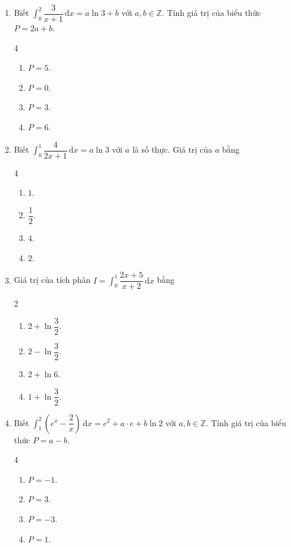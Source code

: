 \documentclass[12pt]{article}
\begin{document}
\begin{enumerate}[label=\textbf{Câu \arabic*.}]
		\item Biết $\displaystyle \int_0^2 \dfrac{3}{x + 1}\,\mathrm{d}x = a\ln 3 + b$ với $a, b \in \mathbb{Z}$. Tính giá trị của biểu thức $P = 2a + b$.
		\begin{multicols}{4}
			\begin{enumerate}[label=\textbf{\Alph*.}]
				\item $P = 5$.
				\item $P = 0$.
				\item $P = 3$.
				\item $P = 6$.
			\end{enumerate}
		\end{multicols}
		
		\item Biết $\displaystyle \int_0^1 \dfrac{4}{2x + 1}\,\mathrm{d}x = a\ln 3$ với $a$ là số thực. Giá trị của $a$ bằng
		\begin{multicols}{4}
			\begin{enumerate}[label=\textbf{\Alph*.}]
				\item $1$.
				\item $\dfrac{1}{2}$.
				\item $4$.
				\item $2$.
			\end{enumerate}
		\end{multicols}
		
		\item Giá trị của tích phân $I = \displaystyle \int_0^1 \dfrac{2x + 5}{x + 2}\,\mathrm{d}x$ bằng
		\begin{multicols}{2}
			\begin{enumerate}[label=\textbf{\Alph*.}]
				\item $2 + \ln\dfrac{3}{2}$.
				\item $2 - \ln\dfrac{3}{2}$.
				\item $2 + \ln 6$.
				\item $1 + \ln\dfrac{3}{2}$.
			\end{enumerate}
		\end{multicols}
		
		\item Biết $\displaystyle \int_1^2 \left( e^x - \dfrac{2}{x} \right)\,\mathrm{d}x = e^2 + a\cdot e + b\ln 2$ với $a, b \in \mathbb{Z}$. Tính giá trị của biểu thức $P = a - b$.
		\begin{multicols}{4}
			\begin{enumerate}[label=\textbf{\Alph*.}]
				\item $P = -1$.
				\item $P = 3$.
				\item $P = -3$.
				\item $P = 1$.
			\end{enumerate}
		\end{multicols}
		

\end{enumerate}
\end{document}
